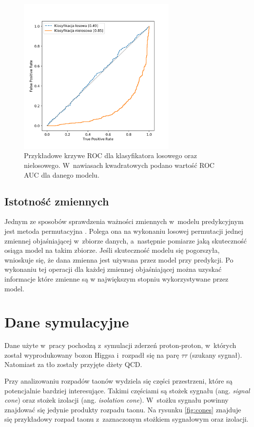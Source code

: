 \documentclass{pracalicmgr}
\begin{document}
	\begin{figure}[h]
	\centering
	\includegraphics[width=0.7\textwidth]{roc_example.png}
	\caption{Przykładowe krzywe ROC dla klasyfikatora losowego oraz nielosowego. W~nawiasach kwadratowych podano wartość ROC AUC dla danego modelu.}
	\label{fig:roc}
	\end{figure}
	
	\section{Istotność zmiennych}
	Jednym ze sposobów sprawdzenia ważności zmiennych w~modelu predykcyjnym jest metoda permutacyjna \cite{breiman2001random}. Polega ona na wykonaniu losowej permutacji jednej zmiennej objaśniającej w~zbiorze danych, a~następnie pomiarze jaką skuteczność osiąga model na takim zbiorze. Jeśli skuteczność modelu się pogorszyła, wnioskuje się, że dana zmienna jest używana przez model przy predykcji. Po wykonaniu tej operacji dla każdej zmiennej objaśniającej można uzyskać informacje które zmienne są w największym stopniu wykorzystywane przez model.
	
    \chapter{Dane symulacyjne}
    \label{ch:dane}
    Dane użyte w~pracy pochodzą z~symulacji zderzeń proton-proton, w~których został wyprodukowany bozon Higgsa i~rozpadł się na parę $\tau\tau$ (szukany sygnał). Natomiast za tło zostały przyjęte dżety QCD.
	
	Przy analizowaniu rozpadów taonów wydziela się części przestrzeni, które są potencjalnie bardziej interesujące. Takimi częściami są stożek sygnału (ang. \textit{signal cone}) oraz stożek izolacji (ang. \textit{isolation cone}). W~stożku sygnału powinny znajdować się jedynie produkty rozpadu taonu. Na rysunku \ref{fig:cones} znajduje się przykładowy rozpad taonu z~zaznaczonym stożkiem sygnałowym oraz izolacji.
\end{document}
